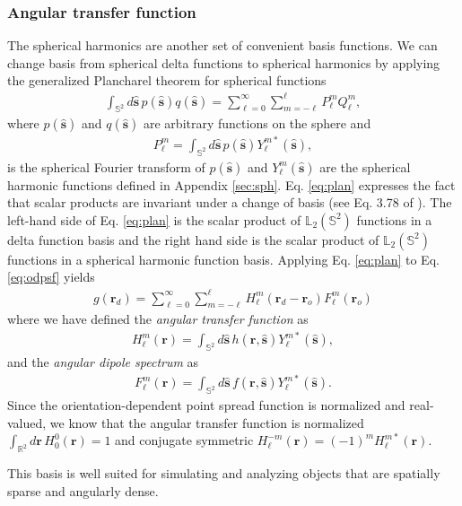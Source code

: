 \documentclass[]{osa-article}
\providecommand{\mb}[1]{\mathbf{#1}}
\providecommand{\ro}{\mathbf{\mathbf{r}}_o}
\providecommand{\rd}{\mathbf{r}_d}
\providecommand{\mh}[1]{\mathbf{\hat{#1}}}
\providecommand{\mbb}[1]{\mathbb{#1}}
\providecommand{\lmsum}{\sum_{\ell=0}^\infty\sum_{m=-\ell}^{\ell}}
\providecommand{\ints}[1]{\int_{\mbb{S}^{#1}}}
\begin{document}
\subsubsection{Angular transfer function}
The spherical harmonics are another set of convenient basis functions. We can
change basis from spherical delta functions to spherical harmonics by applying
the generalized Plancharel theorem for spherical functions
\begin{align}
  \ints{2}d\mh{s}{}\, p(\mh{s})q(\mh{s}) = \lmsum P_\ell^m Q_\ell^m, \label{eq:plan}
\end{align}
where $p(\mh{s})$ and $q(\mh{s})$ are arbitrary functions on the sphere and
\begin{align}
  P_\ell^m = \int_{\mbb{S}^2}d\mh{s}\, p(\mh{s})Y_\ell^{m*}(\mh{s}), 
\end{align}
is the spherical Fourier transform of $p(\mh{s})$ and $Y_{\ell}^m(\mh{s})$ are
the spherical harmonic functions defined in Appendix \ref{sec:sph}. Eq.
\ref{eq:plan} expresses the fact that scalar products are invariant under a
change of basis (see Eq. 3.78 of \cite{barrett2004}). The left-hand side of Eq.
\ref{eq:plan} is the scalar product of $\mbb{L}_2(\mbb{S}^2)$ functions in a
delta function basis and the right hand side is the scalar product of
$\mbb{L}_2(\mbb{S}^2)$ functions in a spherical harmonic function basis.
Applying Eq. \ref{eq:plan} to Eq. \ref{eq:odpsf} yields
\begin{align}
  g(\rd) = \lmsum H_\ell^m(\rd - \ro)F_\ell^m(\ro) \label{eq:atf-form}
\end{align}
where we have defined the \textit{angular transfer function} as
\begin{align}
  H_\ell^m(\mb{r}) = \int_{\mbb{S}^2}d\mh{s}\, h(\mb{r}, \mh{s})Y_{\ell}^{m*}(\mh{s}),\label{eq:atf-prep} 
\end{align}
and the \textit{angular dipole spectrum} as
\begin{align}
  F_\ell^m(\mb{r}) = \int_{\mbb{S}^2}d\mh{s}\, f(\mb{r}, \mh{s})Y_{\ell}^{m*}(\mh{s}).
\end{align}
Since the orientation-dependent point spread function is normalized and
real-valued, we know that the angular transfer function is normalized
$\int_{\mbb{R}^2}d\mb{r}\, H_0^0(\mb{r}) = 1$ and conjugate symmetric
$H_\ell^{-m}(\mb{r}) = (-1)^mH_\ell^{m*}(\mb{r})$.

This basis is well suited for simulating and analyzing objects that are
spatially sparse and angularly dense.
\end{document}
